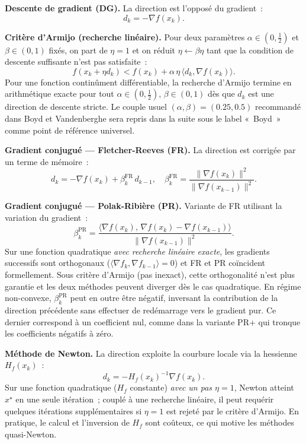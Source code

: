 \documentclass[10pt,a4paper]{article}
\begin{document}
\textbf{Descente de gradient (DG).} La direction est l'opposé du gradient~:
\[
  d_k = -\nabla f(x_k).
\]

\textbf{Critère d'Armijo (recherche linéaire).} Pour deux paramètres $\alpha \in (0, \tfrac{1}{2})$ et $\beta \in (0,1)$ fixés, on part de $\eta = 1$ et on réduit $\eta \leftarrow \beta\eta$ tant que la condition de descente suffisante n'est pas satisfaite~:
\[
  f(x_k + \eta d_k) < f(x_k) + \alpha \, \eta \, \langle d_k, \nabla f(x_k) \rangle. \tag{Armijo}
\]
Pour une fonction continûment différentiable, la recherche d'Armijo termine en arithmétique exacte pour tout $\alpha \in (0, \tfrac{1}{2})$, $\beta \in (0,1)$ dès que $d_k$ est une direction de descente stricte. Le couple usuel $(\alpha, \beta) = (0.25, 0.5)$ recommandé dans Boyd et Vandenberghe sera repris dans la suite sous le label «~Boyd~» comme point de référence universel.

\textbf{Gradient conjugué — Fletcher-Reeves (FR).} La direction est corrigée par un terme de mémoire~:
\[
  d_k = -\nabla f(x_k) + \beta_k^{\text{FR}} \, d_{k-1}, \quad \beta_k^{\text{FR}} = \frac{\|\nabla f(x_k)\|^2}{\|\nabla f(x_{k-1})\|^2}.
\]

\textbf{Gradient conjugué — Polak-Ribière (PR).} Variante de FR utilisant la variation du gradient~:
\[
  \beta_k^{\text{PR}} = \frac{\langle \nabla f(x_k),\, \nabla f(x_k) - \nabla f(x_{k-1}) \rangle}{\|\nabla f(x_{k-1})\|^2}.
\]
Sur une fonction quadratique \emph{avec recherche linéaire exacte}, les gradients successifs sont orthogonaux ($\langle \nabla f_k, \nabla f_{k-1}\rangle = 0$) et FR et PR coïncident formellement. Sous critère d'Armijo (pas inexact), cette orthogonalité n'est plus garantie et les deux méthodes peuvent diverger dès le cas quadratique. En régime non-convexe, $\beta_k^{\text{PR}}$ peut en outre être négatif, inversant la contribution de la direction précédente sans effectuer de redémarrage vers le gradient pur. Ce dernier correspond à un coefficient nul, comme dans la variante PR+ qui tronque les coefficients négatifs à zéro.

\textbf{Méthode de Newton.} La direction exploite la courbure locale via la hessienne $H_f(x_k)$~:
\[
  d_k = -H_f(x_k)^{-1} \nabla f(x_k).
\]
Sur une fonction quadratique ($H_f$ constante) \emph{avec un pas $\eta = 1$}, Newton atteint $x^\star$ en une seule itération~; couplé à une recherche linéaire, il peut requérir quelques itérations supplémentaires si $\eta=1$ est rejeté par le critère d'Armijo. En pratique, le calcul et l'inversion de $H_f$ sont coûteux, ce qui motive les méthodes quasi-Newton.
\end{document}
